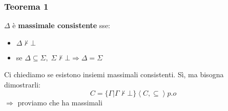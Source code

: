 \documentclass{article}
\theoremstyle{break}
\theoremstyle{break}
\theoremstyle{break}
\theoremstyle{break}
\begin{document}
\subsubsection{Teorema 1}
\begin{definition}
  \( \Delta \) è \textbf{massimale consistente} sse:
  \begin{itemize}
    \item \( \Delta \not\vdash \bot \) 
    \item se \( \Delta \subseteq \Sigma,\; \Sigma \not\vdash \bot \Rightarrow \Delta = \Sigma \)
  \end{itemize}
  Ci chiediamo se esistono insiemi massimali consistenti. Sì, ma bisogna dimostrarli:
  \[
    C = \{\Gamma | \Gamma \not\vdash \bot\} \left<C,\subseteq\right> p.o
  \] 
  \( \Rightarrow \) proviamo che ha massimali
\end{definition}
\end{document}
